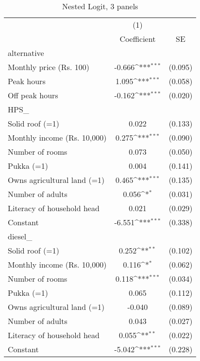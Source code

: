 \begin{table}[htbp]\centering
\def\sym#1{\ifmmode^{#1}\else\(^{#1}\)\fi}
\caption{Nested Logit, 3 panels}
\begin{tabular}{l*{1}{cc}}
\toprule
                    &\multicolumn{1}{c}{(1)}         &            \\
                    & Coefficient         &          SE\\
\midrule
alternative         &                     &            \\
Monthly price (Rs. 100)&      -0.666\sym{***}&     (0.095)\\
Peak hours          &       1.095\sym{***}&     (0.058)\\
Off peak hours      &      -0.162\sym{***}&     (0.020)\\
\midrule
HPS\_                &                     &            \\
Solid roof (=1)     &       0.022         &     (0.133)\\
Monthly income (Rs. 10,000)&       0.275\sym{***}&     (0.090)\\
Number of rooms     &       0.073         &     (0.050)\\
Pukka (=1)          &       0.004         &     (0.141)\\
Owns agricultural land (=1)&       0.465\sym{***}&     (0.135)\\
Number of adults    &       0.056\sym{*}  &     (0.031)\\
Literacy of household head&       0.021         &     (0.029)\\
Constant            &      -6.551\sym{***}&     (0.338)\\
\midrule
diesel\_             &                     &            \\
Solid roof (=1)     &       0.252\sym{**} &     (0.102)\\
Monthly income (Rs. 10,000)&       0.116\sym{*}  &     (0.062)\\
Number of rooms     &       0.118\sym{***}&     (0.034)\\
Pukka (=1)          &       0.065         &     (0.112)\\
Owns agricultural land (=1)&      -0.040         &     (0.089)\\
Number of adults    &       0.043         &     (0.027)\\
Literacy of household head&       0.055\sym{**} &     (0.022)\\
Constant            &      -5.042\sym{***}&     (0.228)\\

\end{tabular}
\end{table}
